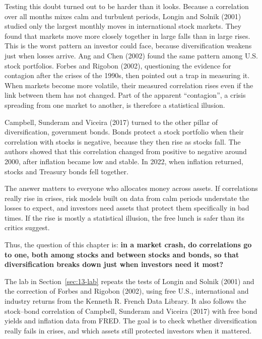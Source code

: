 Testing this doubt turned out to be harder than it looks. Because a correlation over all months mixes calm and turbulent periods, Longin and Solnik (2001) studied only the largest monthly moves in international stock markets. They found that markets move more closely together in large falls than in large rises. This is the worst pattern an investor could face, because diversification weakens just when losses arrive. Ang and Chen (2002) found the same pattern among U.S. stock portfolios. Forbes and Rigobon (2002), questioning the evidence for contagion after the crises of the 1990s, then pointed out a trap in measuring it. When markets become more volatile, their measured correlation rises even if the link between them has not changed. Part of the apparent ``contagion'', a crisis spreading from one market to another, is therefore a statistical illusion.

Campbell, Sunderam and Viceira (2017) turned to the other pillar of diversification, government bonds. Bonds protect a stock portfolio when their correlation with stocks is negative, because they then rise as stocks fall. The authors showed that this correlation changed from positive to negative around 2000, after inflation became low and stable. In 2022, when inflation returned, stocks and Treasury bonds fell together.


The answer matters to everyone who allocates money across assets. If correlations really rise in crises, risk models built on data from calm periods understate the losses to expect, and investors need assets that protect them specifically in bad times. If the rise is mostly a statistical illusion, the free lunch is safer than its critics suggest. 


Thus, the question of this chapter is: \textbf{in a market crash, do correlations go to one, both among stocks and between stocks and bonds, so that diversification breaks down just when investors need it most?}

The lab in Section~\ref{sec:13-lab} repeats the tests of Longin and Solnik (2001) and the correction of Forbes and Rigobon (2002), using free U.S., international and industry returns from the Kenneth R. French Data Library. It also follows the stock--bond correlation of Campbell, Sunderam and Viceira (2017) with free bond yields and inflation data from FRED. The goal is to check whether diversification really fails in crises, and which assets still protected investors when it mattered.


